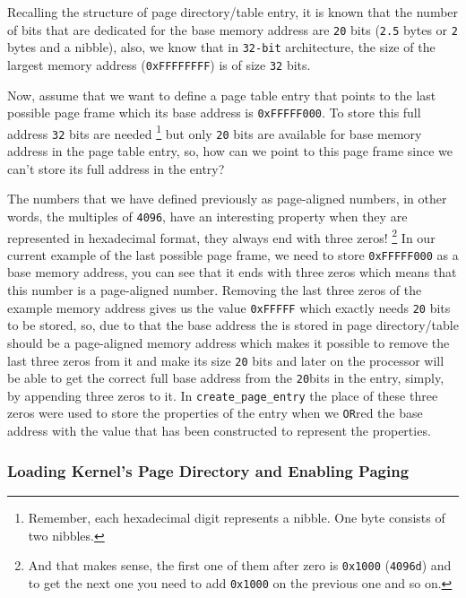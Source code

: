 Recalling the structure of page directory/table entry, it is known that
the number of bits that are dedicated for the base memory address are
\lstinline!20! bits (\lstinline!2.5! bytes or \lstinline!2! bytes and a
nibble), also, we know that in \lstinline!32-bit! architecture, the size
of the largest memory address (\lstinline!0xFFFFFFFF!) is of size
\lstinline!32! bits.

Now, assume that we want to define a page table entry that points to the
last possible page frame which its base address is
\lstinline!0xFFFFF000!. To store this full address \lstinline!32! bits
are needed \footnote{Remember, each hexadecimal digit represents a
  nibble. One byte consists of two nibbles.} but only \lstinline!20!
bits are available for base memory address in the page table entry, so,
how can we point to this page frame since we can't store its full
address in the entry?

The numbers that we have defined previously as page-aligned numbers, in
other words, the multiples of \lstinline!4096!, have an interesting
property when they are represented in hexadecimal format, they always
end with three zeros! \footnote{And that makes sense, the first one of
  them after zero is \lstinline!0x1000! (\lstinline!4096d!) and to get
  the next one you need to add \lstinline!0x1000! on the previous one
  and so on.} In our current example of the last possible page frame, we
need to store \lstinline!0xFFFFF000! as a base memory address, you can
see that it ends with three zeros which means that this number is a
page-aligned number. Removing the last three zeros of the example memory
address gives us the value \lstinline!0xFFFFF! which exactly needs
\lstinline!20! bits to be stored, so, due to that the base address the
is stored in page directory/table should be a page-aligned memory
address which makes it possible to remove the last three zeros from it
and make its size \lstinline!20! bits and later on the processor will be
able to get the correct full base address from the \lstinline!20!bits in
the entry, simply, by appending three zeros to it. In
\lstinline!create_page_entry! the place of these three zeros were used
to store the properties of the entry when we \lstinline!OR!red the base
address with the value that has been constructed to represent the
properties.

\subsubsection{Loading Kernel's Page Directory and Enabling
Paging}\label{loading-kernels-page-directory-and-enabling-paging}

